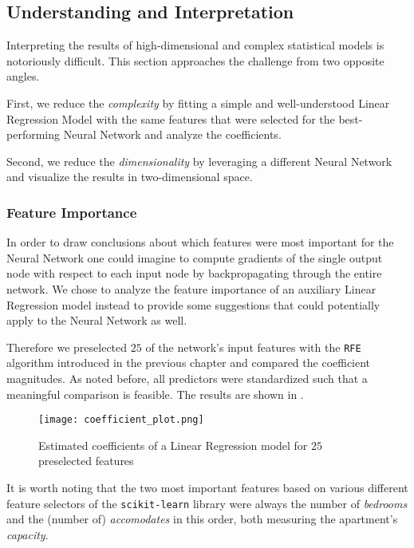 \subsection{Understanding and Interpretation}

Interpreting the results of high-dimensional and complex statistical models is notoriously difficult.
This section approaches the challenge from two opposite angles.

First, we reduce the \emph{complexity} by fitting a simple and well-understood Linear Regression Model with the same features that were selected for the best-performing Neural Network and analyze the coefficients.

Second, we reduce the \emph{dimensionality} by leveraging a different Neural Network and visualize the results in two-dimensional space.

\subsubsection{Feature Importance}

In order to draw conclusions about which features were most important for the Neural Network one could imagine to compute gradients of the single output node with respect to each input node by backpropagating through the entire network.
We chose to analyze the feature importance of an auxiliary Linear Regression model instead to provide some suggestions that could potentially apply to the Neural Network as well.

Therefore we preselected $25$ of the network's input features with the \texttt{RFE} algorithm introduced in the previous chapter and compared the coefficient magnitudes.
As noted before, all predictors were standardized such that a meaningful comparison is feasible.
The results are shown in .

\begin{figure}[t]
  \centering
  \texttt{[image: coefficient\_plot.png]}
  \caption{Estimated coefficients of a Linear Regression model for $25$ preselected features}
  \label{fig:coefficient-plot}
\end{figure}

It is worth noting that the two most important features based on various different feature selectors of the \texttt{scikit-learn} library were always the number of \emph{bedrooms} and the (number of) \emph{accomodates} in this order, both measuring the apartment's \emph{capacity}.


